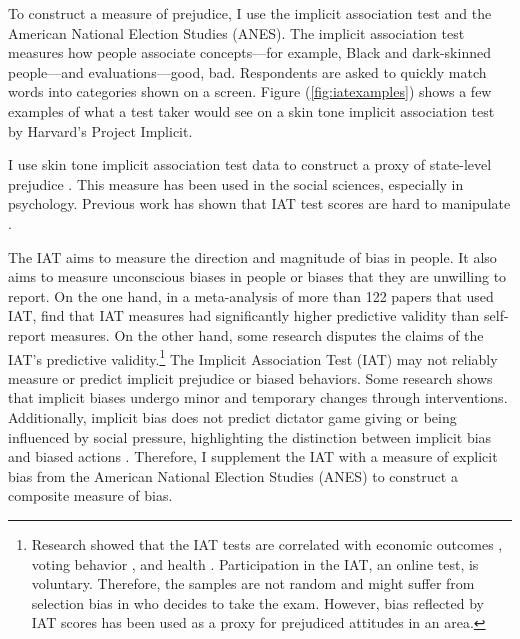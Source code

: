 \documentclass[12pt,english]{article}
\begin{document}
To construct a measure of prejudice, I use the implicit association test and the American National Election Studies (ANES). The implicit association test measures how people associate concepts---for example, Black and dark-skinned people---and evaluations---good, bad. Respondents are asked to quickly match words into categories shown on a screen. Figure (\ref{fig:iatexamples}) shows a few examples of what a test taker would see on a skin tone implicit association test by Harvard's Project Implicit.

I use skin tone implicit association test data to construct a proxy of state-level prejudice \autocite{greenwaldMeasuringIndividualDifferences1998}. This measure has been used in the social sciences, especially in psychology. Previous work has shown that IAT test scores are hard to manipulate \autocite{egloffPredictiveValidityImplicit2002}.

The IAT aims to measure the direction and magnitude of bias in people. It also aims to measure unconscious biases in people or biases that they are unwilling to report. On the one hand, in a meta-analysis of more than 122 papers that used IAT, \textcite{greenwaldMeasuringIndividualDifferences1998} find that IAT measures had significantly higher predictive validity than self-report measures. On the other hand, some research disputes the claims of the IAT's predictive validity.\footnote{Research showed that the IAT tests are correlated with economic outcomes \autocite{chettyRaceEconomicOpportunity2020,gloverDiscriminationSelfFulfillingProphecy2017}, voting behavior \autocite{friesePredictingVotingBehavior2007}, and health \autocite{leitnerRacialBiasAssociated2016}. Participation in the IAT, an online test, is voluntary. Therefore, the samples are not random and might suffer from selection bias in who decides to take the exam. However, bias reflected by IAT scores has been used as a proxy for prejudiced attitudes in an area\autocite{chettyRaceEconomicOpportunity2020}.} The Implicit Association Test (IAT) may not reliably measure or predict implicit prejudice or biased behaviors. Some research shows that implicit biases undergo minor and temporary changes through interventions. Additionally, implicit bias does not predict dictator game giving or being influenced by social pressure, highlighting the distinction between implicit bias and biased actions \autocite{arkesAttributionsImplicitPrejudice2004,forscherMetaanalysisProceduresChange2019,leeDoesImplicitBias2018}. Therefore, I supplement the IAT with a measure of explicit bias from the American National Election Studies (ANES) to construct a composite measure of bias. 
\end{document}
